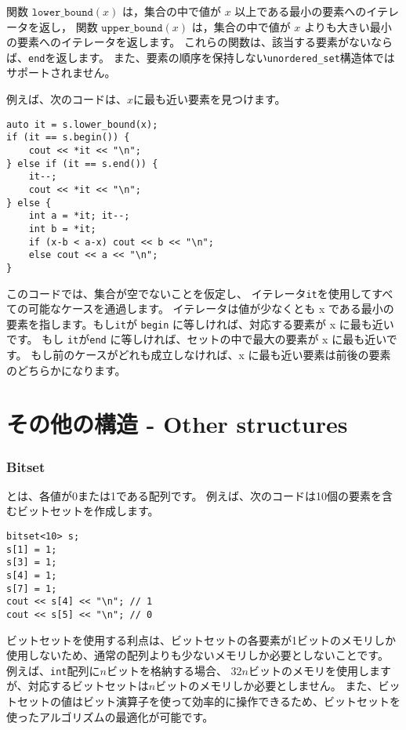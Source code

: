 関数 $\texttt{lower\_bound}(x)$ は，集合の中で値が $x$ 以上である最小の要素へのイテレータを返し，
関数 $\texttt{upper\_bound}(x)$ は，集合の中で値が $x$ よりも大きい最小の要素へのイテレータを返します。
これらの関数は、該当する要素がないならば、\texttt{end}を返します。
また、要素の順序を保持しない\texttt{unordered\_set}構造体ではサポートされません。

\begin{samepage}
例えば、次のコードは、$x$に最も近い要素を見つけます。

\begin{lstlisting}
auto it = s.lower_bound(x);
if (it == s.begin()) {
    cout << *it << "\n";
} else if (it == s.end()) {
    it--;
    cout << *it << "\n";
} else {
    int a = *it; it--;
    int b = *it;
    if (x-b < a-x) cout << b << "\n";
    else cout << a << "\n";
}
\end{lstlisting}

このコードでは、集合が空でないことを仮定し、
イテレータ\texttt{it}を使用してすべての可能なケースを通過します。
イテレータは値が少なくとも x である最小の要素を指します。もし\texttt{it}が \texttt{begin} に等しければ、対応する要素が x に最も近いです。
もし \texttt{it}が\texttt{end} に等しければ、セットの中で最大の要素が x に最も近いです。
もし前のケースがどれも成立しなければ、x に最も近い要素は前後の要素のどちらかになります。

\end{samepage}

\section{その他の構造 - Other structures}

\subsubsection{Bitset}


 とは、各値が0または1である配列です。
例えば、次のコードは10個の要素を含むビットセットを作成します。

\begin{lstlisting}
bitset<10> s;
s[1] = 1;
s[3] = 1;
s[4] = 1;
s[7] = 1;
cout << s[4] << "\n"; // 1
cout << s[5] << "\n"; // 0
\end{lstlisting}

ビットセットを使用する利点は、ビットセットの各要素が1ビットのメモリしか使用しないため、通常の配列よりも少ないメモリしか必要としないことです。
例えば、\texttt{int}配列に$n$ビットを格納する場合、
$32n$ビットのメモリを使用しますが、対応するビットセットは$n$ビットのメモリしか必要としません。
また、ビットセットの値はビット演算子を使って効率的に操作できるため、ビットセットを使ったアルゴリズムの最適化が可能です。

